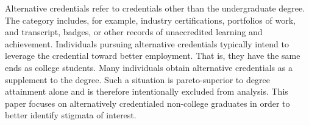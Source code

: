 \documentclass[review]{elsarticle}
\begin{document}
Alternative credentials refer to credentials other than the undergraduate degree\cite{brown2017complex}.
The category includes, for example,
industry certifications,
portfolios of work,
and transcript, badges, or other records of unaccredited learning and achievement.
Individuals pursuing alternative credentials typically intend to leverage the credential toward better employment.
That is, they have the same ends as college students.
Many individuals obtain alternative credentials as a supplement to the degree.
Such a situation is pareto-superior to degree attainment alone and is therefore intentionally excluded from analysis.
This paper focuses on alternatively credentialed non-college graduates in order to better identify stigmata of interest.



\end{document}
